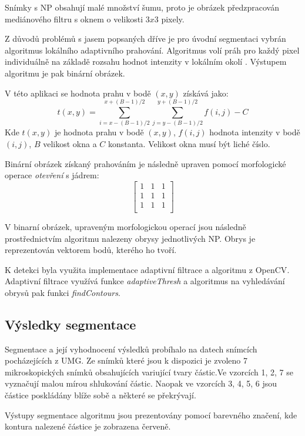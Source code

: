 \documentclass[11pt,twoside,a4paper,table]{book}
\begin{document}
Snímky s NP obsahují malé množství šumu, proto je obrázek předzpracován mediánového filtru s oknem o velikosti $3x3$ pixely. 

Z důvodů problémů s jasem popsaných dříve je pro úvodní segmentaci vybrán algoritmus lokálního adaptivního prahování. Algoritmus volí práh pro každý pixel individuálně na základě rozsahu hodnot intenzity v lokálním okolí \cite{on:adaptive}. Výstupem algoritmu je pak binární obrázek.

V této aplikaci se hodnota prahu v bodě $(x,y)$ získává jako:
\begin{equation}
t(x,y) = \sum_{i=x-(B-1)/2}^{x+(B-1)/2} \sum_{j=y-(B-1)/2}^{y+(B-1)/2}f(i,j) - C
\end{equation}
Kde $t(x,y)$ je hodnota prahu v bodě $(x,y)$, $f(i,j)$ hodnota intenzity v bodě $(i,j)$, $B$ velikost okna a $C$ konstanta. Velikost okna musí být liché číslo.

Binární obrázek získaný prahováním je následně upraven pomocí morfologické operace \textit{otevření} s jádrem:
\begin{equation}
\begin{bmatrix}
1 & 1 & 1 \\
1 & 1 & 1 \\
1 & 1 & 1 \\
\end{bmatrix}
\end{equation}

V binarní obrázek, upraveným morfologickou operací jsou následně prostřednictvím algoritmu \cite{suzuki85} nalezeny obrysy jednotlivých NP. Obrys je reprezentován vektorem bodů, kterého ho tvoří.

K detekci byla využita implementace adaptivní filtrace a algoritmu \cite{suzuki85} z OpenCV\cite{opencv_library}. Adaptivní filtrace využívá funkce \textit{adaptiveThresh} a algoritmus na vyhledávání obrysů pak funkci \textit{findContours}.

\subsection{Výsledky segmentace}
Segmentace a její vyhodnocení výsledků probíhalo na datech snímcích pocházejících z UMG. Ze snímků které jsou k dispozici je zvoleno 7 mikroskopických snímků obsahujících variující tvary částic.Ve vzorcích 1, 2, 7 se vyznačují malou mírou shlukování částic. Naopak ve vzorcích 3, 4, 5, 6 jsou částice poskládány blíže sobě a některé se překrývají.

Výstupy segmentace algoritmu jsou prezentovány pomocí barevného značení, kde kontura nalezené částice je zobrazena červeně.
\end{document}
